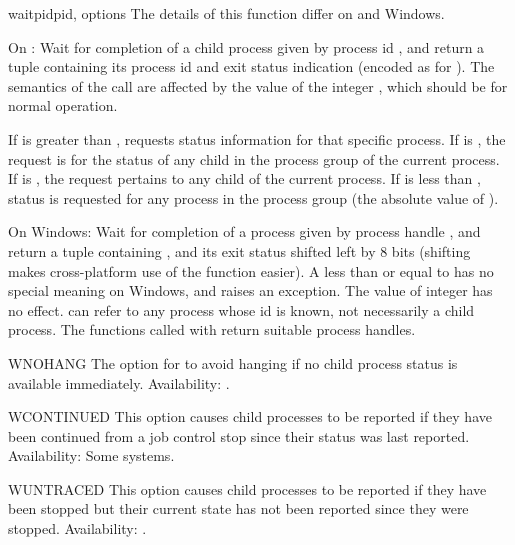 \begin{funcdesc}{waitpid}{pid, options}
The details of this function differ on \UNIX{} and Windows.

On \UNIX:
Wait for completion of a child process given by process id ,
and return a tuple containing its process id and exit status
indication (encoded as for ).  The semantics of the
call are affected by the value of the integer , which
should be  for normal operation.

If  is greater than ,  requests
status information for that specific process.  If  is
, the request is for the status of any child in the process
group of the current process.  If  is , the request
pertains to any child of the current process.  If  is less
than , status is requested for any process in the process
group  (the absolute value of ).

On Windows:
Wait for completion of a process given by process handle ,
and return a tuple containing ,
and its exit status shifted left by 8 bits (shifting makes cross-platform
use of the function easier).
A  less than or equal to  has no special meaning on
Windows, and raises an exception.
The value of integer  has no effect.
 can refer to any process whose id is known, not necessarily a
child process.
The  functions called with 
return suitable process handles.
\end{funcdesc}

\begin{datadesc}{WNOHANG}
The option for  to avoid hanging if no child
process status is available immediately.
Availability: \UNIX.
\end{datadesc}

\begin{datadesc}{WCONTINUED}
This option causes child processes to be reported if they have been
continued from a job control stop since their status was last
reported.
Availability: Some \UNIX{} systems.
\end{datadesc}

\begin{datadesc}{WUNTRACED}
This option causes child processes to be reported if they have been
stopped but their current state has not been reported since they were
stopped.
Availability: \UNIX.
\end{datadesc}

